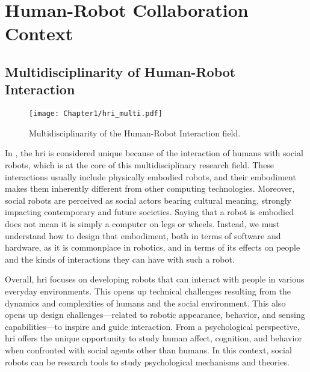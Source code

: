 \cleardoublepage

\ifdefined{}
\else
\setcounter{chapter}{0}
\dominitoc
\faketableofcontents
\fi

\chapter{Human-Robot Collaboration Context}
\label{chap:1}
\minitoc




\section{Multidisciplinarity of Human-Robot Interaction}

\begin{figure}
    \center
    \texttt{[image: Chapter1/hri\_multi.pdf]}
    \caption{Multidisciplinarity of the Human-Robot Interaction field.}
    \label{fig:hri_multi}
\end{figure}

In \cite{bartneck_human_robot_2020}, the \acrfull{hri} is considered unique because of the interaction of humans with social robots, which is at the core of this multidisciplinary research field. These interactions usually include physically embodied robots, and their embodiment makes them inherently different from other computing technologies. Moreover, social robots are perceived as social actors bearing cultural meaning, strongly impacting contemporary and future societies. Saying that a robot is embodied does not mean it is simply a computer on legs or wheels. Instead, we must understand how to design that embodiment, both in terms of software and hardware, as it is commonplace in robotics, and in terms of its effects on people and the kinds of interactions they can have with such a robot.

Overall, \acrfull{hri} focuses on developing robots that can interact with people in various everyday environments. This opens up technical challenges resulting from the dynamics and complexities of humans and the social environment. This also opens up design challenges—related to robotic appearance, behavior, and sensing capabilities—to inspire and guide interaction. From a psychological perspective, \acrshort{hri} offers the unique opportunity to study human affect, cognition, and behavior when confronted with social agents other than humans. In this context, social robots can be research tools to study psychological mechanisms and theories.

